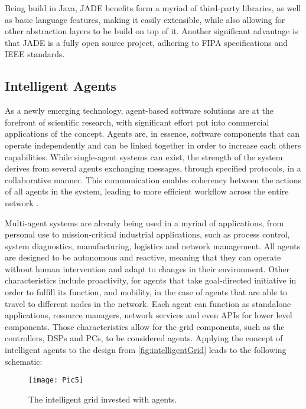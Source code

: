 Being build in Java, JADE benefits form a myriad of third-party libraries, as well as basic language features, making it easily extensible,
while also allowing for other abstraction layers to be build on top of it. Another significant advantage is that JADE is a fully open source
project, adhering to FIPA specifications and IEEE standards.

\subsection{Intelligent Agents}

As a newly emerging technology, agent-based software solutions are at the forefront of scientific research, with significant effort put into
commercial applications of the concept. Agents are, in essence, software components that can operate independently and can be linked together
in order to increase each others capabilities. While single-agent systems can exist, the strength of the system derives from several agents
exchanging messages, through specified protocols, in a collaborative manner. This communication enables coherency between the actions of all
agents in the system, leading to more efficient workflow across the entire network \cite{24, 105}.

Multi-agent systems are already being used in a myriad of applications, from personal use to mission-critical industrial applications, such
as process control, system diagnostics, manufacturing, logistics and network management. All agents are designed to be autonomous and reactive,
meaning that they can operate without human intervention and adapt to changes in their environment. Other characteristics include proactivity, 
for agents that take goal-directed initiative in order to fulfill its function, and mobility, in the case of agents that are able to travel
to different nodes in the network. Each agent can function as standalone applications, resource managers, network services and even APIs for
lower level components. Those characteristics allow for the grid components, such as the controllers, DSPs and PCs, to be considered agents.
Applying the concept of intelligent agents to the design from \cref{fig:intelligentGrid} leads to the following schematic:

\begin{figure}[H]
	\texttt{[image: Pic5]}
    \caption{The intelligent grid invested with agents. \cite{88} \label{fig:intelligentGridWithAgents}}
\end{figure}

